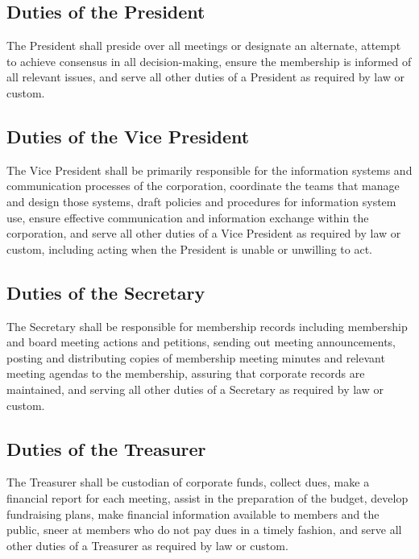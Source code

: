 \documentclass[10pt,letterpaper,titlepage]{article}
\begin{document}
\subsection{Duties of the President}

The President shall preside over all meetings or designate an alternate,
attempt to achieve consensus in all decision-making, ensure the membership is
informed of all relevant issues, and serve all other duties of a President as
required by law or custom.

\subsection{Duties of the Vice President}

The Vice President shall be primarily responsible for the information systems
and communication processes of the corporation, coordinate the teams that
manage and design those systems, draft policies and procedures for information
system use, ensure effective communication and information exchange within the
corporation, and serve all other duties of a Vice President as required by
law or custom, including acting when the President is unable or unwilling to
act.

\subsection{Duties of the Secretary}

The Secretary shall be responsible for membership records including membership
and board meeting actions and petitions, sending out meeting announcements,
posting and distributing copies of membership meeting minutes and relevant
meeting agendas to the membership, assuring that corporate records are
maintained, and serving all other duties of a Secretary as required by law or
custom.

\subsection{Duties of the Treasurer}

The Treasurer shall be custodian of corporate funds, collect dues, make a
financial report for each meeting, assist in the preparation of the budget,
develop fundraising plans, make financial information available to members and
the public, sneer at members who do not pay dues in a timely fashion, and serve
all other duties of a Treasurer as required by law or custom.
\end{document}
